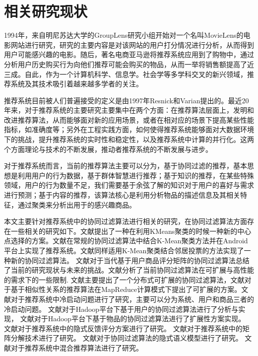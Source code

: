 \section{相关研究现状}
1994年，来自明尼苏达大学的GroupLens研究小组开始对一个名叫MovieLens的电影网站进行研究，研究的主要内容是对该网站的用户打分情况进行分析，从而得到用户可能感兴趣的电影。随后，著名电商亚马逊将推荐系统应用到了购物中，通过分析用户历史购买行为向他们推荐可能会购买的物品，从而一举将销售额提高了近三成。自此，作为一个计算机科学、信息学。社会学等多学科交叉的新兴领域，推荐系统及其技术吸引着越来越多学者的关注。

推荐系统目前被人们普遍接受的定义是由1997年Resnick和Varian提出的\cite{resnick1997recommender}。最近20年来，对于推荐系统的主要研究主要集中在两个方面：在推荐算法层面上，发明和改进推荐算法，从而能够面对新的应用场景，或者在相对应的场景下提高某些性能指标，如准确度等；另外在工程实践方面，如何使得推荐系统能够面对大数据环境下的挑战，提升推荐系统的实时性和稳定性，以及推荐系统中计算的并行化。这两个方面理论与技术的不断发展，推动者推荐系统的不断发展与进步。

对于推荐系统而言，当前的推荐算法主要可以分为，基于协同过滤的推荐，基本思想是利用用户的行为数据，基于群体智慧进行推荐；基于知识的推荐，在某些特殊领域，用户的行为数量不足，我们需要基于余弦了解的知识对于用户的喜好与需求进行预测；基于内容的推荐，该算法核心是利用分析物品的描述信息及其相关特征，通过聚类来分析出用于的感兴趣商品。

本文主要针对推荐系统中的协同过滤算法进行相关的研究，在协同过滤算法方面存在一些相关的研究如下。文献\cite{Zahra:2015ja}提出了一种在利用KMeans聚类的时候一种新的中心点选择的方案。文献\cite{Kularbphettong:2014vm}在常规的协同过滤算法中结合K-Mean聚类方法并在Android平台上实现了推荐系统。文献\cite{Dakhel:2011dt}同样适用K-Mean聚类结合邻居投票的方法实现了一种新的协同过滤算法。%
文献\cite{Shi:2014fj}\cite{Su:2009cl}对于当代基于用户商品评分矩阵的协同过滤算法总结了当前的研究现状与未来的挑战。文献\cite{Cacheda:2011bh}分析了当前协同过滤算法在可扩展与高性能的需求下的一些限制.
文献\cite{Narang:2011iq}主要提出了一个分布式可扩展的协同过滤算法，文献\cite{Schelter:2012jg}对于基于相似性关系的推荐算法在MapReduce计算模式下提出了可扩展的方案。文献\cite{Liu:2014hc}对于推荐系统中冷启动问题进行了研究，主要可以分为系统、用户和商品三者的冷启动问题。
文献\cite{Zhao:2010ha}对于Hadoop平台下基于用户的协同过滤算法进行了分析与实现，
文献\cite{Jiang:2011bp}对于Hadoop平台下基于物品的协同过滤算法进行了扩展性方案实现。
文献\cite{Hu:2008el}对于推荐系统中的隐式反馈评分方案进行了研究。
文献\cite{Koren:2009jg}对于推荐系统中的矩阵分解技术进行了研究。
文献\cite{hofmann2004latent}对于协同过滤算法的隐式语义模型进行了研究。
文献\cite{Burke:2002fy}对于推荐系统中混合推荐算法进行了研究。

